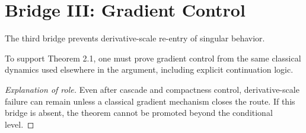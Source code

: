 \section{Bridge III: Gradient Control}

The third bridge prevents derivative-scale re-entry of singular behavior.

\begin{proposition}
To support Theorem 2.1, one must prove gradient control from the same classical dynamics used elsewhere in the argument, including explicit continuation logic.
\end{proposition}

\begin{proof}[Explanation of role]
Even after cascade and compactness control, derivative-scale failure can remain unless a classical gradient mechanism closes the route. If this bridge is absent, the theorem cannot be promoted beyond the conditional level.
\end{proof}
